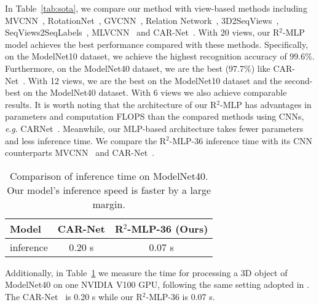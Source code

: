 \documentclass[11pt]{article}
\newcommand{\eg}{\textit{e}.\textit{g}. }
\begin{document}
In Table~\ref{tab:sota}, we compare our method with view-based methods including MVCNN~\citep{su2015multi}, RotationNet~\citep{kanezaki2018rotationnet}, GVCNN~\citep{feng2018gvcnn}, Relation Network~\citep{yang2019learning}, 3D2SeqViews~\citep{han20193d2seqvies}, SeqViews2SeqLabels~\citep{han2019seqview2seqlabels}, MLVCNN~\citep{jiang2019mlvcnn} and CAR-Net~\citep{xu2021multi}. With 20 views, our R$^2$-MLP model achieves the best performance compared with these methods. Specifically, on the ModelNet10 dataset, we achieve the highest recognition accuracy of 99.6\%. Furthermore, on the ModelNet40 dataset, we are the best (97.7\%) like CAR-Net~\citep{xu2021multi}.
With 12 views, we are the best on the ModelNet10 dataset and the second-best on the ModelNet40 dataset.
With 6 views we also achieve comparable results.
It is worth noting that the architecture of our R$^2$-MLP has advantages in parameters and computation FLOPS than the compared methods using CNNs, \eg CAR\-Net~\citep{xu2021multi}. Meanwhile, our MLP-based architecture takes fewer parameters and less inference time. We compare the R$^2$-MLP-36 inference time with its CNN counterparts MVCNN~\citep{su2015multi} and CAR-Net~\citep{xu2021multi}.

\begin{table}[ht]
\caption{Comparison of inference time on ModelNet40.
Our model's inference speed is faster by a large margin.}\label{tab:size}
\centering
\begin{tabular}{lcc}
\toprule
{Model} & CAR-Net \citep{xu2021multi} & R$^2$-MLP-36 (Ours) \\
\midrule
inference & 0.20 s & 0.07 s \\
\bottomrule
\end{tabular}\vspace{0.2in}
\end{table}

Additionally, in Table~\ref{tab:size} we measure the time for processing a 3D object of ModelNet40 on one NVIDIA V100 GPU, following the same setting adopted in \citep{xu2021multi}. The CAR-Net~\citep{xu2021multi} is 0.20 s while our R$^2$-MLP-36 is 0.07 s.
\end{document}
